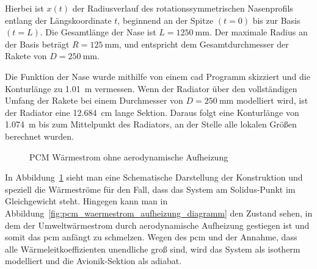 Hierbei ist $x(t)$ der Radiusverlauf des rotationssymmetrischen Nasenprofils entlang der Längskoordinate $t$, beginnend an der Spitze $(t=0)$ bis zur Basis $(t=L)$.
Die Gesamtlänge der Nase ist $L = \SI{1250}{\milli\meter}$. Der maximale Radius an der Basis beträgt $R = \SI{125}{\milli\meter}$, und entspricht dem Gesamtdurchmesser der Rakete von $D = \SI{250}{\milli\meter}$.

Die Funktion der Nase wurde mithilfe von einem \ac{cad} Programm skizziert und die Konturlänge zu \SI{1,01}{\meter} vermessen. Wenn der Radiator über den vollständigen Umfang der Rakete
bei einem Durchmesser von $D = \SI{250}{\milli\meter}$ modelliert wird, ist der Radiator eine \SI{12,684}{\centi\meter} lange Sektion.
Daraus folgt eine Konturlänge von \SI{1,074}{\meter} bis zum Mittelpunkt des Radiators, an der Stelle alle lokalen Größen berechnet wurden.

\begin{figure}
  \centering
  \caption{PCM Wärmestrom ohne aerodynamische Aufheizung}\label{fig:pcm_waermestrom_diagramm}
\end{figure}

In Abbildung~\ref{fig:pcm_waermestrom_diagramm} sieht man eine Schematische Darstellung der Konstruktion und speziell die Wärmeströme
für den Fall, dass das System am Solidus-Punkt im Gleichgewicht steht. Hingegen kann man in Abbildung~\ref{fig:pcm_waermestrom_aufheizung_diagramm}
den Zustand sehen, in dem der Umweltwärmestrom durch aerodynamische Aufheizung gestiegen ist und somit das \ac{pcm} anfängt zu schmelzen.
Wegen des \ac{pcm} und der Annahme, dass alle Wärmeleitkoeffizienten unendliche groß sind, wird das System als isotherm modelliert und die Avionik-Sektion als
adiabat.

